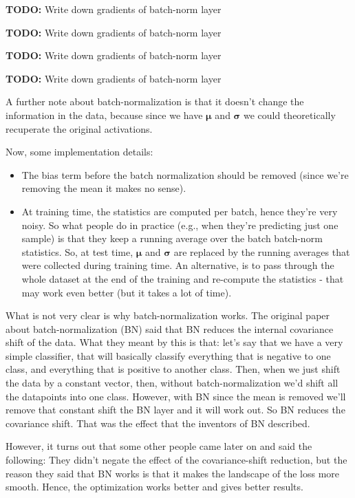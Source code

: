 \documentclass[a2paper,8pt]{extarticle}
\newcommand{\vmu}{\boldsymbol{\mu}}
\newcommand{\vsigma}{\boldsymbol{\sigma}}
\newcommand{\todo}[1]{\textbf{TODO:} #1}
\newcommand{\todo}[1]{%
}
\begin{document}
\begin{landscape}
\begin{multicols*}{7}
\todo{Write down gradients of batch-norm layer}

\todo{Write down gradients of batch-norm layer}

\todo{Write down gradients of batch-norm layer}

\todo{Write down gradients of batch-norm layer}

A further note about batch-normalization is that it doesn't change the
information in the data, because since we have $\vmu$ and $\vsigma$ we could
theoretically recuperate the original activations.

Now, some implementation details:
\begin{itemize}
  \item The bias term before the batch normalization should be removed (since
  we're removing the mean it makes no sense).
  \item At training time, the statistics are computed per batch, hence they're
  very noisy. So what people do in practice (e.g., when they're predicting just
  one sample) is that they keep a running average over the batch batch-norm
  statistics. So, at test time, $\vmu$ and $\vsigma$ are replaced by the running
  averages that were collected during training time. An alternative, is to pass
  through the whole dataset at the end of the training and re-compute the
  statistics - that may work even better (but it takes a lot of time).
\end{itemize}

What is not very clear is why batch-normalization works. The original paper
about batch-normalization (BN) said that BN reduces the internal covariance
shift of the data. What they meant by this is that: let's say that we have a
very simple classifier, that will basically classify everything that is negative
to one class, and everything that is positive to another class. Then, when we
just shift the data by a constant vector, then, without batch-normalization we'd
shift all the datapoints into one class. However, with BN since the mean is
removed we'll remove that constant shift the BN layer and it will work out. So
BN reduces the covariance shift. That was the effect that the inventors of BN
described.

However, it turns out that some other people came later on and said the
following: They didn't negate the effect of the covariance-shift reduction, but
the reason they said that BN works is that it makes the landscape of the loss
more smooth. Hence, the optimization works better and gives better results.


\end{multicols*}
\end{landscape}
\end{document}
